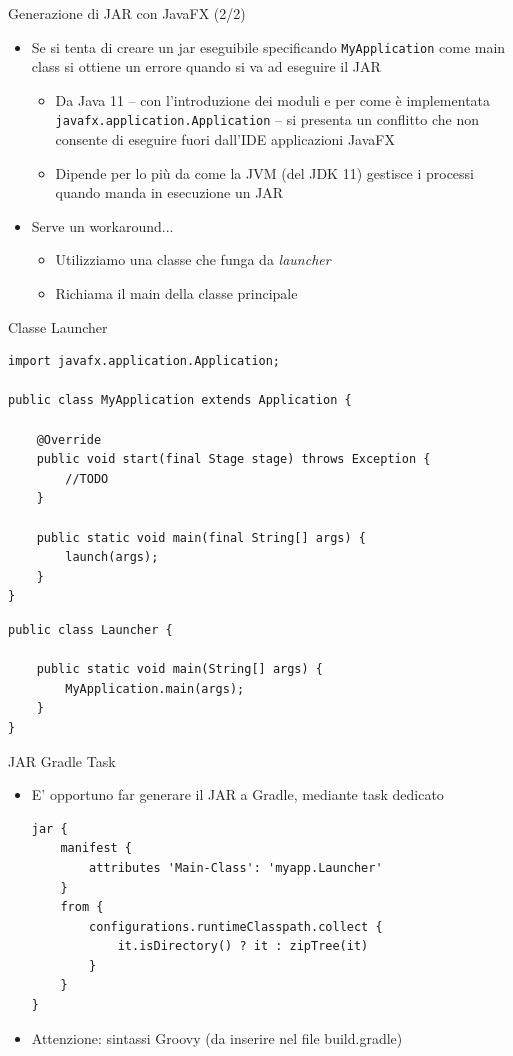 \documentclass[presentation]{beamer}
\begin{document}
\begin{frame}{Generazione di JAR con JavaFX (2/2)}
\begin{itemize}
\item Se si tenta di creare un jar eseguibile specificando \texttt{MyApplication} come main class si ottiene un errore quando si va ad eseguire il JAR
\begin{itemize}
\item Da Java 11 -- con l'introduzione dei moduli e per come è implementata \texttt{javafx.application.Application} -- si presenta un conflitto che non consente di eseguire fuori dall'IDE applicazioni JavaFX
\item Dipende per lo più da come la JVM (del JDK 11) gestisce i processi quando manda in esecuzione un JAR
\end{itemize}
\item Serve un workaround...
\begin{itemize}
\item Utilizziamo una classe che funga da \emph{launcher}
\item Richiama il main della classe principale
\end{itemize}
\end{itemize}
\end{frame}

\begin{frame}[fragile]{Classe Launcher}
\begin{lstlisting}
import javafx.application.Application;

public class MyApplication extends Application {

	@Override
	public void start(final Stage stage) throws Exception {
		//TODO
	}
	
	public static void main(final String[] args) {
		launch(args);
	}
}
\end{lstlisting}

\begin{lstlisting}
public class Launcher {
    
    public static void main(String[] args) {
        MyApplication.main(args);
    }
}
\end{lstlisting}
\end{frame}

\begin{frame}[fragile]{JAR Gradle Task}
\begin{itemize}
\item E' opportuno far generare il JAR a Gradle, mediante task dedicato
\begin{lstlisting}
jar {   
    manifest {
        attributes 'Main-Class': 'myapp.Launcher'
    }
    from {
        configurations.runtimeClasspath.collect { 
        	it.isDirectory() ? it : zipTree(it) 
        }
    }
}
\end{lstlisting}
\item Attenzione: sintassi Groovy (da inserire nel file build.gradle)
\end{itemize}
\end{frame}
\end{document}
